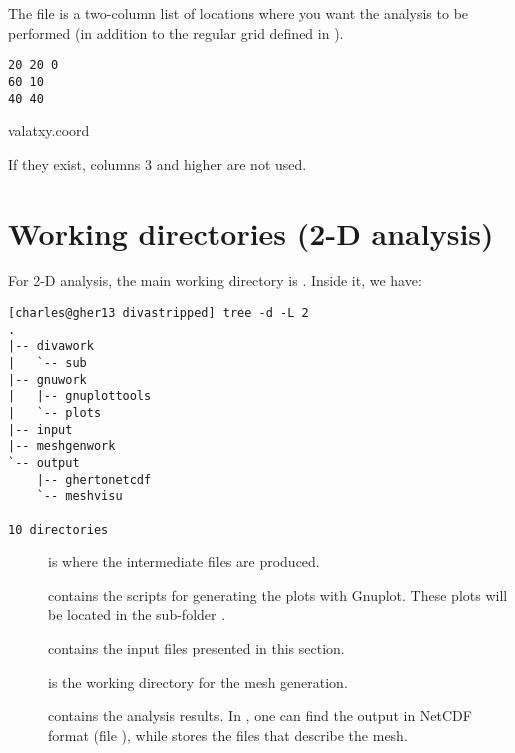 The file  is a two-column list of locations where you want the analysis to be performed (in addition to the regular grid defined in ).  

\begin{exfile}[htpb]
\begin{footnotesize}
\texttt{20 20 0\\
60 10\\
40 40} 
\end{footnotesize}
\caption{valatxy.coord\label{ex:valatxy}}
\end{exfile}

If they exist, columns 3 and higher are not used.


\section{Working directories (2-D analysis)}

For 2-D analysis, the main working directory is . Inside it, we have:
\begin{lstlisting}[style=Bash]
[charles@gher13 divastripped] tree -d -L 2
.
|-- divawork
|   `-- sub
|-- gnuwork
|   |-- gnuplottools
|   `-- plots
|-- input
|-- meshgenwork
`-- output
    |-- ghertonetcdf
    `-- meshvisu

10 directories
\end{lstlisting}


\begin{description}

\item[] is where the intermediate files are produced.
\item[] contains the scripts for generating the plots with Gnuplot. These plots will be located in the sub-folder .
\item[] contains the input files presented in this section.
\item[] is the working directory for the mesh generation.
\item[] contains the analysis results. In , one can find the output in NetCDF format (file ), while  stores the files that describe the mesh.
\end{description}
